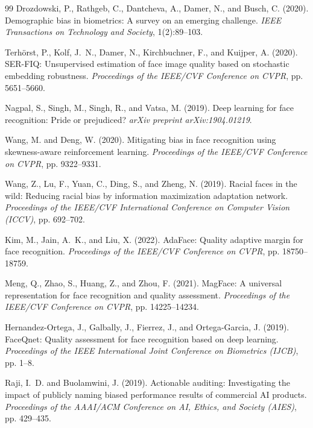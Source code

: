 \documentclass[12pt,a4paper]{report}
\begin{document}
\begin{thebibliography}{99}
Drozdowski, P., Rathgeb, C., Dantcheva, A., Damer, N., and Busch, C. (2020).
\newblock Demographic bias in biometrics: A survey on an emerging challenge.
\newblock \textit{IEEE Transactions on Technology and Society}, 1(2):89--103.

Terh{\"o}rst, P., Kolf, J.~N., Damer, N., Kirchbuchner, F., and Kuijper, A. (2020).
\newblock SER-FIQ: Unsupervised estimation of face image quality based on stochastic embedding robustness.
\newblock \textit{Proceedings of the IEEE/CVF Conference on CVPR}, pp. 5651--5660.

Nagpal, S., Singh, M., Singh, R., and Vatsa, M. (2019).
\newblock Deep learning for face recognition: Pride or prejudiced?
\newblock \textit{arXiv preprint arXiv:1904.01219}.

Wang, M. and Deng, W. (2020).
\newblock Mitigating bias in face recognition using skewness-aware reinforcement learning.
\newblock \textit{Proceedings of the IEEE/CVF Conference on CVPR}, pp. 9322--9331.

Wang, Z., Lu, F., Yuan, C., Ding, S., and Zheng, N. (2019).
\newblock Racial faces in the wild: Reducing racial bias by information maximization adaptation network.
\newblock \textit{Proceedings of the IEEE/CVF International Conference on Computer Vision (ICCV)}, pp. 692--702.

Kim, M., Jain, A.~K., and Liu, X. (2022).
\newblock AdaFace: Quality adaptive margin for face recognition.
\newblock \textit{Proceedings of the IEEE/CVF Conference on CVPR}, pp. 18750--18759.

Meng, Q., Zhao, S., Huang, Z., and Zhou, F. (2021).
\newblock MagFace: A universal representation for face recognition and quality assessment.
\newblock \textit{Proceedings of the IEEE/CVF Conference on CVPR}, pp. 14225--14234.

Hernandez-Ortega, J., Galbally, J., Fierrez, J., and Ortega-Garcia, J. (2019).
\newblock FaceQnet: Quality assessment for face recognition based on deep learning.
\newblock \textit{Proceedings of the IEEE International Joint Conference on Biometrics (IJCB)}, pp. 1--8.

Raji, I.~D. and Buolamwini, J. (2019).
\newblock Actionable auditing: Investigating the impact of publicly naming biased performance results of commercial AI products.
\newblock \textit{Proceedings of the AAAI/ACM Conference on AI, Ethics, and Society (AIES)}, pp. 429--435.


\end{thebibliography}
\end{document}

